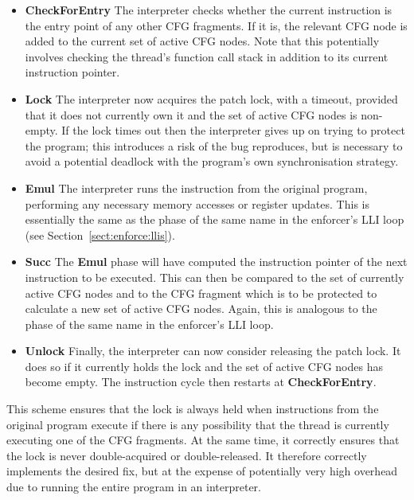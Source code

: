 \begin{itemize}
\item \textbf{CheckForEntry} The interpreter checks whether the
  current instruction is the entry point of any other CFG fragments.
  If it is, the relevant CFG node is added to the current set of
  active CFG nodes.  Note that this potentially involves checking the
  thread's function call stack in addition to its current instruction
  pointer.  

\item \textbf{Lock} The interpreter now acquires the patch lock, with
  a timeout, provided that it does not currently own it and the set of
  active CFG nodes is non-empty.  If the lock times out then the
  interpreter gives up on trying to protect the program; this
  introduces a risk of the bug reproduces, but is necessary to avoid a
  potential deadlock with the program's own synchronisation strategy.

\item \textbf{Emul} The interpreter runs the instruction from the
  original program, performing any necessary memory accesses or
  register updates.  This is essentially the same as the phase of the
  same name in the enforcer's LLI loop (see
  Section~\ref{sect:enforce:llis}).

\item \textbf{Succ} The \textbf{Emul} phase will have computed the
  instruction pointer of the next instruction to be executed.  This
  can then be compared to the set of currently active CFG nodes and to
  the CFG fragment which is to be protected to calculate a new set of
  active CFG nodes.  Again, this is analogous to the phase of the same
  name in the enforcer's LLI loop.

\item \textbf{Unlock} Finally, the interpreter can now consider
  releasing the patch lock.  It does so if it currently holds the lock
  and the set of active CFG nodes has become empty.  The instruction
  cycle then restarts at \textbf{CheckForEntry}.
\end{itemize}

This scheme ensures that the lock is always held when instructions
from the original program execute if there is any possibility that the
thread is currently executing one of the CFG fragments.  At the same
time, it correctly ensures that the lock is never double-acquired or
double-released.  It therefore correctly implements the desired fix,
but at the expense of potentially very high overhead due to running
the entire program in an interpreter.


